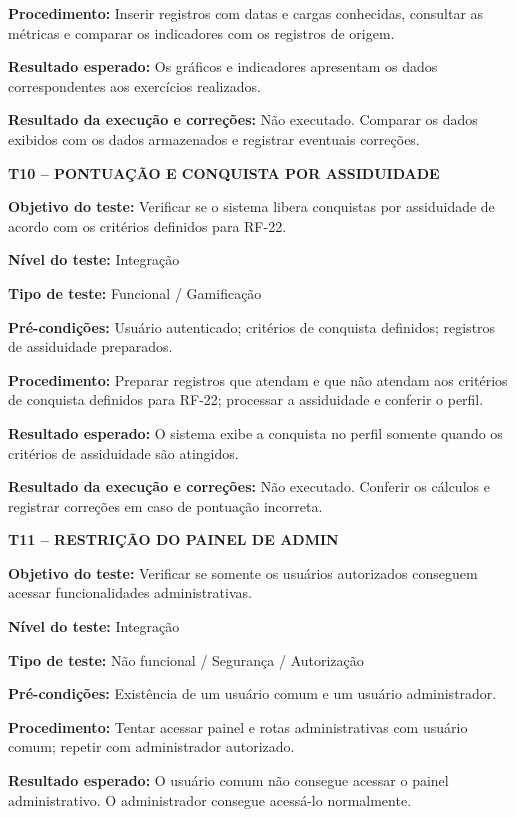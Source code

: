 \noindent\textbf{Procedimento:} Inserir registros com datas e cargas conhecidas, consultar as métricas e comparar os indicadores com os registros de origem.

\noindent\textbf{Resultado esperado:} Os gráficos e indicadores apresentam os dados correspondentes aos exercícios realizados.

\noindent\textbf{Resultado da execução e correções:} Não executado. Comparar os dados exibidos com os dados armazenados e registrar eventuais correções.

\textbf{T10 -- PONTUAÇÃO E CONQUISTA POR ASSIDUIDADE}

\noindent\textbf{Objetivo do teste:} Verificar se o sistema libera conquistas por assiduidade de acordo com os critérios definidos para RF-22.

\noindent\textbf{Nível do teste:} Integração

\noindent\textbf{Tipo de teste:} Funcional / Gamificação

\noindent\textbf{Pré-condições:} Usuário autenticado; critérios de conquista definidos; registros de assiduidade preparados.

\noindent\textbf{Procedimento:} Preparar registros que atendam e que não atendam aos critérios de conquista definidos para RF-22; processar a assiduidade e conferir o perfil.

\noindent\textbf{Resultado esperado:} O sistema exibe a conquista no perfil somente quando os critérios de assiduidade são atingidos.

\noindent\textbf{Resultado da execução e correções:} Não executado. Conferir os cálculos e registrar correções em caso de pontuação incorreta.

\textbf{T11 -- RESTRIÇÃO DO PAINEL DE ADMIN}

\noindent\textbf{Objetivo do teste:} Verificar se somente os usuários autorizados conseguem acessar funcionalidades administrativas.

\noindent\textbf{Nível do teste:} Integração

\noindent\textbf{Tipo de teste:} Não funcional / Segurança / Autorização

\noindent\textbf{Pré-condições:} Existência de um usuário comum e um usuário administrador.

\noindent\textbf{Procedimento:} Tentar acessar painel e rotas administrativas com usuário comum; repetir com administrador autorizado.

\noindent\textbf{Resultado esperado:} O usuário comum não consegue acessar o painel administrativo. O administrador consegue acessá-lo normalmente.

